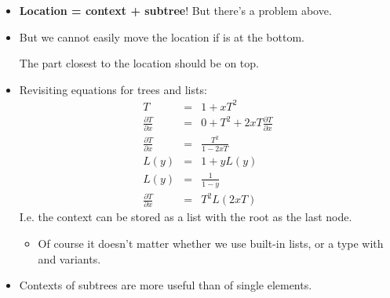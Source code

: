 \documentclass{beamer}
\newcommand{\tmstrong}[1]{\textbf{#1}}
\begin{document}
\begin{itemize}
  \item {\tmstrong{Location = context + subtree}}! But there's a problem
  above.
  
  \item But we cannot easily move the location if {} is at the
  bottom.
  
  The part closest to the location should be on top.
  
  \item Revisiting equations for trees and lists:
  \begin{eqnarray*}
    T & = & 1 + xT^2\\
    \frac{\partial T}{\partial x} & = & 0 + T^2 + 2 xT \frac{\partial
    T}{\partial x}\\
    \frac{\partial T}{\partial x} & = & \frac{T^2}{1 - 2 xT}\\
    L (y) & = & 1 + yL (y)\\
    L (y) & = & \frac{1}{1 - y}\\
    \frac{\partial T}{\partial x} & = & T^2 L (2 xT)
  \end{eqnarray*}
  I.e. the context can be stored as a list with the root as the last node.
  \begin{itemize}
    \item Of course it doesn't matter whether we use built-in lists, or a type
    with {} and {} variants.
  \end{itemize}
  \item Contexts of subtrees are more useful than of single elements.
  
  {}{}{\hlopt{= }}{}{\hlopt{\textbar
  }}{}{}{}{\hlopt{* }}{}{\hlopt{* }}{}{\hlendline{}}\\
  {}{}{\hlopt{=
  }}{}{\hlopt{\textbar
  }}{}{\hlendline{}}\\
  {}{}{\hlopt{=
  (}}{}{\hlopt{* }}{}{\hlopt{*
  }}{}{\hlopt{) }}{}{\hlendline{}}\\
  {}{}{\hlopt{= \{}}{}{\hlopt{:
  }}{}{\hlopt{; }}{}{\hlopt{: }}{}{\hlopt{\}}}{\hlendline{}}\\
  {}{}{\hlopt{\{}}{}{\hlopt{\} =
  }}{}{\hlendline{}}\\
  {}{}{\hlopt{\{}}{}{\hlopt{\}
  }}{}{\hlopt{= \{}}{}{\hlopt{;
  }}{}{\hlopt{\}}}{\hlendline{}}\\
  {}{}{\hlopt{\{}}{}{\hlopt{;
  }}{}{\hlopt{\} = \{}}{}{\hlopt{=}}{}{\hlopt{; }}{}{\hlopt{\}}}{\hlendline{}}
  

\end{itemize}
\end{document}
